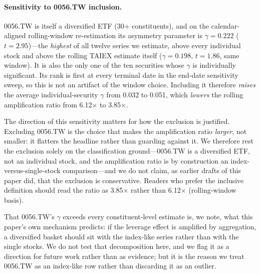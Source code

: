 \paragraph{Sensitivity to 0056.TW inclusion.} 0056.TW is itself a diversified ETF (30+ constituents), and on the calendar-aligned rolling-window re-estimation its asymmetry parameter is $\gamma = 0.222$ ($t = 2.95$)---the \textit{highest} of all twelve series we estimate, above every individual stock and above the rolling TAIEX estimate itself ($\gamma = 0.198$, $t = 1.86$, same window). It is also the only one of the ten securities whose $\gamma$ is individually significant. Its rank is first at every terminal date in the end-date sensitivity sweep, so this is not an artifact of the window choice. Including it therefore \textit{raises} the average individual-security $\gamma$ from 0.032 to 0.051, which \textit{lowers} the rolling amplification ratio from 6.12$\times$ to 3.85$\times$.

The direction of this sensitivity matters for how the exclusion is justified. Excluding 0056.TW is the choice that makes the amplification ratio \textit{larger}, not smaller: it flatters the headline rather than guarding against it. We therefore rest the exclusion solely on the classification ground---0056.TW is a diversified ETF, not an individual stock, and the amplification ratio is by construction an index-versus-single-stock comparison---and we do not claim, as earlier drafts of this paper did, that the exclusion is conservative. Readers who prefer the inclusive definition should read the ratio as 3.85$\times$ rather than 6.12$\times$ (rolling-window basis).

That 0056.TW's $\gamma$ exceeds every constituent-level estimate is, we note, what this paper's own mechanism predicts: if the leverage effect is amplified by aggregation, a diversified basket should sit with the index-like series rather than with the single stocks. We do not test that decomposition here, and we flag it as a direction for future work rather than as evidence; but it is the reason we treat 0056.TW as an index-like row rather than discarding it as an outlier.

